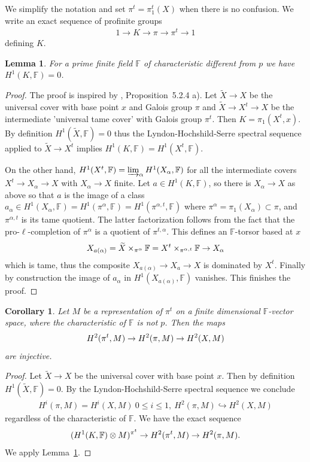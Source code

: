\documentclass[12pt]{amsart}
\theoremstyle{plain}
\newtheorem{lem}[thm]{Lemma}
\newtheorem{cor}[thm]{Corollary}
\theoremstyle{definition}
\numberwithin{thm}{section}
\renewcommand{\tilde}{\widetilde}
\newcommand{\ga}[2]{\begin{gather}\label{#1}#2 \end{gather}}
\newcommand{\F}{{\mathbb F}}
\numberwithin{equation}{section}
\begin{document}
We simplify the notation and set $\pi^t=\pi_1^t(X)$ when there is no confusion.  
We  write an exact sequence of profinite groups
\ga{4}{1\to K\to \pi \to \pi^t\to1} 
defining $K$.
\begin{lem} \label{lem:vanK} 
For a prime finite field $\F$ of characteristic different from $p$ we have
$H^1(K, \F)=0$.
\end{lem}
\begin{proof}
The proof is inspired by \cite{GM71},  Proposition~5.2.4 a).
Let $\tilde X \to X$ be the universal cover with base point $x$ and Galois group $\pi$ and $\tilde X  \to X^t\to X$ be the intermediate 'universal tame cover' with Galois group $\pi^t$.  Then $K=\pi_1(X^t,x)$. By definition $H^1(\tilde X, \F)=0$ thus the 
 Lyndon-Hochshild-Serre spectral sequence applied to $\tilde X\to X^t$ 
 implies
$
H^1(K, \F) =H^1(X^t, \F)$. 

On the other hand, $H^1(X^t, \F)=\varinjlim_\alpha H^1(X_\alpha, \F)$ for all the intermediate covers $X^t\to X_\alpha\to X$ with $X_\alpha\to X$ finite.  Let $a\in H^1(K, \F)$, so there is $X_\alpha\to X$ as above so that $a$ is the image of a class 
$a_\alpha\in H^1(X_\alpha, \F) =H^1(\pi^\alpha, 
\F) = H^1(\pi^{\alpha,t}, 
\F)  $ where $\pi^\alpha=\pi_1(X_\alpha)
\subset  \pi$, and $\pi^{\alpha,t }$ is its tame quotient. The latter factorization  follows from the fact that the pro-$\ell$-completion of $\pi^\alpha$  is a quotient of $\pi^{t,\alpha}$. This defines an $\F$-torsor based at $x$
\ga{}{ X_{a(\alpha)} =\tilde X \times_{\pi^\alpha}\F = X^t\times_{  \pi^{\alpha,t} } \F \to X_\alpha \notag}
which is tame, thus the composite 
$ X_{a(\alpha)}\to X_a\to X $
is dominated by $X^t$. Finally by construction the image of $a_\alpha$ in $H^1(X_{a(\alpha)}, \F)$ vanishes. This finishes the proof. 






\end{proof}

  \begin{cor} \label{cor:inj}
Let $M$ be a  representation of $\pi^t$ on a finite dimensional $\F$-vector space, where the characteristic of $\F$ is not $p$. Then the maps
\ga{}{ H^2(\pi^t, M) \to H^2(\pi, M)  \to H^2(X, M) \notag}
are injective.

\end{cor}
\begin{proof} 
Let $\tilde X\to X$ be the universal cover with base point $x$. Then by definition
$H^1(\tilde X, \F)=0$. By the Lyndon-Hochshild-Serre spectral sequence we conclude
\ga{22}{ H^i(\pi, M)=H^i(X, M) \ 0\le i\le 1, \ H^2(\pi, M) \hookrightarrow H^2(X, M)}
regardless of the characteristic of $\F$. 
We have the exact sequence 
\ga{}{  (H^1(K, \F) \otimes M)^{\pi^t} \to H^2(\pi^t, M) \to H^2(\pi, M).\notag}
We apply Lemma~\ref{lem:vanK}.
\end{proof}
\end{document}

